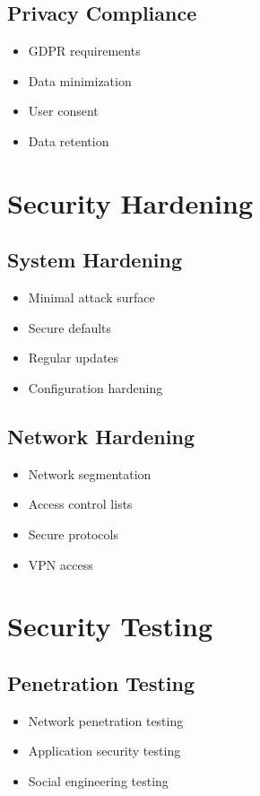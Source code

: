 \documentclass{article}
\begin{document}
\subsection{Privacy Compliance}
\begin{itemize}
    \item GDPR requirements
    \item Data minimization
    \item User consent
    \item Data retention
\end{itemize}

\section{Security Hardening}

\subsection{System Hardening}
\begin{itemize}
    \item Minimal attack surface
    \item Secure defaults
    \item Regular updates
    \item Configuration hardening
\end{itemize}

\subsection{Network Hardening}
\begin{itemize}
    \item Network segmentation
    \item Access control lists
    \item Secure protocols
    \item VPN access
\end{itemize}

\section{Security Testing}

\subsection{Penetration Testing}
\begin{itemize}
    \item Network penetration testing
    \item Application security testing
    \item Social engineering testing
\end{itemize}
\end{document}
